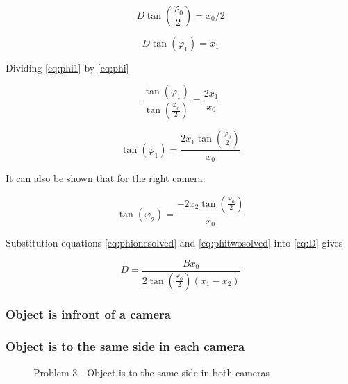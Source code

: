 \begin{equation} \label{eq:phi}
D\tan(\frac{\varphi_{0}}{2}) = x_{0} / 2
\end{equation}

\begin{equation} \label{eq:phi1}
D\tan(\varphi_1) = x_1
\end{equation}

Dividing \eqref{eq:phi1} by \eqref{eq:phi}

\begin{equation} \label{eq:tanovertan}
\frac{\tan(\varphi_1)}{\tan(\frac{\varphi_0}{2})} = \frac{2x_1}{x_0}
\end{equation}

\begin{equation} \label{eq:phionesolved}
\tan(\varphi_1) = \frac{2x_1\tan(\frac{\varphi_0}{2})}{x_0}
\end{equation}

It can also be shown that for the right camera:

\begin{equation} \label{eq:phitwosolved}
\tan(\varphi_2) = \frac{-2x_2\tan(\frac{\varphi_0}{2})}{x_0}
\end{equation}

Substitution equations \eqref{eq:phionesolved} and \eqref{eq:phitwosolved} into \eqref{eq:D} gives

\begin{equation} \label{eq:Distance1}
D = \frac{Bx_0}{2\tan(\frac{\varphi_0}{2})(x_1 - x_2)}
\end{equation}


\subsubsection{Object is infront of a camera}


\subsubsection{Object is to the same side in each camera}

\begin{figure}
\caption{Problem 3 - Object is to the same side in both cameras}
\label{problem_between}
\end{figure}
